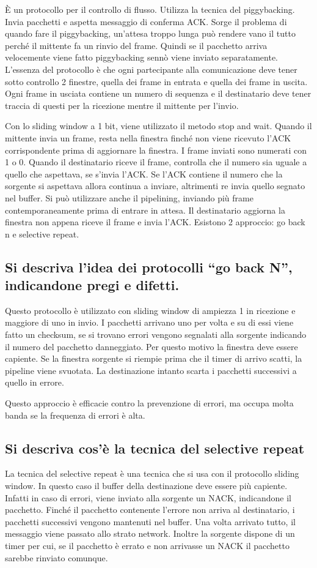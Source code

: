 È un protocollo per il controllo di flusso. Utilizza la tecnica del piggybacking. Invia pacchetti e
aspetta messaggio di conferma ACK. Sorge il problema di quando fare il piggybacking, un’attesa
troppo lunga può rendere vano il tutto perché il mittente fa un rinvio del frame. Quindi se il
pacchetto arriva velocemente viene fatto piggybacking sennò viene inviato separatamente.
L’essenza del protocollo è che ogni partecipante alla comunicazione deve tener sotto controllo 2
finestre, quella dei frame in entrata e quella dei frame in uscita. Ogni frame in usciata contiene un numero di sequenza e il destinatario deve tener traccia di questi per la ricezione mentre il mittente per l’invio.

Con lo sliding window a 1 bit, viene utilizzato il metodo stop and wait. Quando il mittente invia un
frame, resta nella finestra finché non viene ricevuto l’ACK corrispondente prima di aggiornare la
finestra. I frame inviati sono numerati con 1 o 0. Quando il destinatario riceve il frame, controlla
che il numero sia uguale a quello che aspettava, se s’invia l’ACK. Se l’ACK contiene il numero che la sorgente si aspettava allora continua a inviare, altrimenti re invia quello segnato nel buffer. Si può utilizzare anche il pipelining, inviando più frame contemporaneamente prima di entrare in attesa. Il destinatario aggiorna la finestra non appena riceve il frame e invia l’ACK. Esistono 2 approccio: go back n e selective repeat.

\subsection{Si descriva l'idea dei protocolli ``go back N'', indicandone pregi e difetti.}

Questo protocollo è utilizzato con sliding window di ampiezza 1 in ricezione e maggiore di uno in
invio. I pacchetti arrivano uno per volta e su di essi viene fatto un checksum, se si trovano errori
vengono segnalati alla sorgente indicando il numero del pacchetto danneggiato. Per questo motivo la finestra deve essere capiente. Se la finestra sorgente si riempie prima che il timer di arrivo scatti, la pipeline viene svuotata. La destinazione intanto scarta i pacchetti successivi a quello in errore.

Questo approccio è efficacie contro la prevenzione di errori, ma occupa molta banda se la frequenza di errori è alta.

\subsection{Si descriva cos'è la tecnica del selective repeat}

La tecnica del selective repeat è una tecnica che si usa con il protocollo sliding window. In questo caso il buffer della destinazione deve essere più capiente. Infatti in caso di errori, viene inviato alla sorgente un NACK, indicandone il pacchetto. Finché il pacchetto contenente l'errore non arriva al destinatario, i pacchetti successivi vengono mantenuti nel buffer. Una volta arrivato tutto, il messaggio viene passato allo strato network. Inoltre la sorgente dispone di un timer per cui, se il pacchetto è errato e non arrivasse un NACK il pacchetto sarebbe rinviato comunque.

\